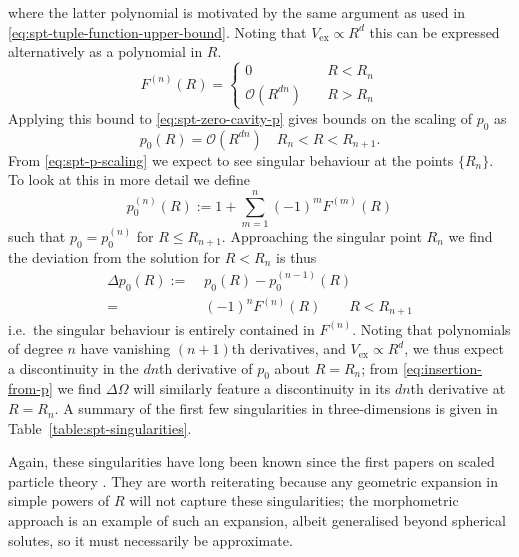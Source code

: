 \documentclass[11pt,twoside]{report}
\begin{document}
where the latter polynomial is motivated by the same argument as used in \eqref{eq:spt-tuple-function-upper-bound}.
Noting that $V_\mathrm{ex} \propto R^d$ this can be expressed alternatively as a polynomial in $R$.
\begin{equation*}
  F^{(n)}(R) =
  \begin{cases}
    0 & \quad R < R_n \\
    \mathcal{O}\left( R^{dn} \right) & \quad R > R_n
  \end{cases}
\end{equation*}
Applying this bound to \eqref{eq:spt-zero-cavity-p} gives bounds on the scaling of $p_0$ as
\begin{equation}\label{eq:spt-p-scaling}
  p_0(R) =
  \mathcal{O}\left( R^{dn} \right)
  \quad R_n < R < R_{n+1}.
\end{equation}
From \eqref{eq:spt-p-scaling} we expect to see singular behaviour at the points $\{R_n\}$.
To look at this in more detail we define
\begin{equation*}
  p_0^{(n)}(R) := 1 + \sum_{m=1}^n (-1)^m F^{(m)}(R)
\end{equation*}
such that $p_0 = p_0^{(n)}$ for $R \le R_{n+1}$.
Approaching the singular point $R_n$ we find the deviation from the solution for $R < R_n$ is thus
\begin{equation*}
  \begin{split}
    \Delta p_0(R) :=& \;
    p_0(R) - p_0^{(n-1)}(R)
    \\ =& \;
    (-1)^n F^{(n)}(R)
    \qquad R < R_{n+1}
  \end{split}
\end{equation*}
i.e.\ the singular behaviour is entirely contained in $F^{(n)}$.
Noting that polynomials of degree $n$ have vanishing $(n+1)$th derivatives, and $V_\mathrm{ex} \propto R^d$, we thus expect a discontinuity in the $dn$th derivative of $p_0$ about $R=R_n$; from \eqref{eq:insertion-from-p} we find $\Delta \Omega$ will similarly feature a discontinuity in its $dn$th derivative at $R=R_n$.
A summary of the first few singularities in three-dimensions is given in Table~\ref{table:spt-singularities}.

Again, these singularities have long been known since the first papers on scaled particle theory \cite{ReissJCP1959,ReissJCP1960}.
They are worth reiterating because any geometric expansion in simple powers of $R$ will not capture these singularities; the morphometric approach is an example of such an expansion, albeit generalised beyond spherical solutes, so it must necessarily be approximate.
\end{document}

